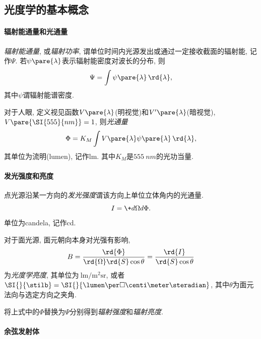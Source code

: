 \documentclass{ctexart}
\begin{document}



\subsection{光度学的基本概念} %
\label{sub:光度学的基本概念}

\paragraph{辐射能通量和光通量} %
\label{par:辐射能通量和光通量}

\emph{辐射能通量}, 或\emph{辐射功率}, 谓单位时间内光源发出或通过一定接收截面的辐射能, 记作$\Psi$. 若$\psi\pare{\lambda}$表示辐射能密度对波长的分布, 则
\[ \Psi = \int \psi\pare{\lambda}\,\rd{\lambda}, \]
其中$\psi$谓辐射能谱密度.
\par
对于人眼, 定义视见函数$V\pare{\lambda}$(明视觉)和$V'\pare{\lambda}$(暗视觉), $V\pare{\SI{555}{nm}} = 1$, 则\emph{光通量}
\[ \Phi = K_M \int V\pare{\lambda} \psi\pare{\lambda}\,\rd{\lambda}, \]
其单位为流明(lumen), 记作lm. 其中$K_M$是$\SI{555}{nm}$的光功当量.



\paragraph{发光强度和亮度} %
\label{par:发光强度和亮度}

点光源沿某一方向的\emph{发光强度}谓该方向上单位立体角内的光通量.
\[ I = \+d{\Omega}d{\Phi}. \]
单位为candela, 记作cd.
\par
对于面光源, 面元朝向本身对光强有影响,
\[ B = \frac{\rd{\Phi}}{\rd{\Omega}\rd{S}\cos\theta} = \frac{\rd{I}}{\rd{S}\cos\theta} \]
为\emph{光度学亮度}, 其单位为$\SI{}{\lumen\per\square\meter\steradian}$, 或者
$\SI{}{\stilb} = \SI{}{\lumen\per\square\centi\meter\steradian}$, 其中$\theta$为面元法向与选定方向之夹角.
\par
将上式中的$\Phi$替换为$\Psi$分别得到\emph{辐射强度}和\emph{辐射亮度}.


\paragraph{余弦发射体} %
\label{par:余弦发射体}
\end{document}
